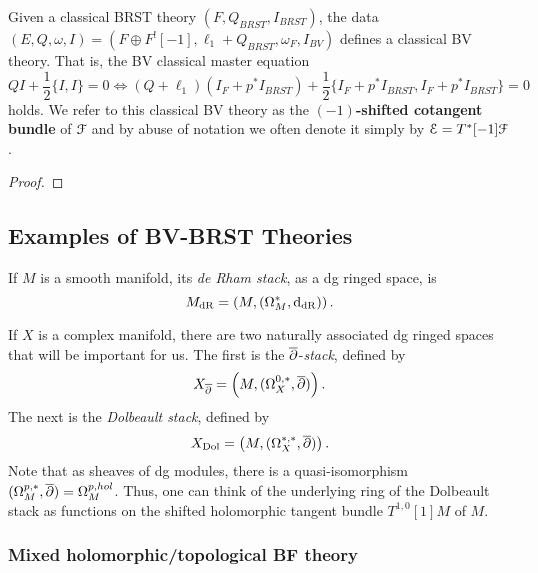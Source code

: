 \documentclass[10pt, oneside]{article}
\begin{document}
\begin{lemma}
Given a classical BRST theory $(F, Q_{BRST}, I_{BRST})$, the data $(E, Q, \omega, I) = (F \oplus F^![-1] , \ell_1 + Q_{BRST} , \omega_F, I_{BV})$ defines a classical BV theory.
That is, the BV classical master equation
\[
Q I + \frac{1}{2} \{I, I\} = 0 \iff (Q + \ell_1) (I_F + p^*I_{BRST}) + \frac{1}{2} \{I_F + p^*I_{BRST}, I_F + p^*I_{BRST}\} = 0
\]
holds.
We refer to this classical BV theory as the {\bf $(-1)$-shifted cotangent bundle} of $\mathcal F$ and by abuse of notation we often denote it simply by $\mathcal E = T^*[-1] \mathcal F$.
\end{lemma}

\begin{proof}
\end{proof}


\subsection{Examples of BV-BRST Theories}


If $M$ is a smooth manifold, its {\em de Rham stack}, as a dg ringed space, is 
\[
M_{\rm dR} = \left(M , (\Omega^*_M, {\rm d}_{\rm dR})\right) .
\] 

If $X$ is a complex manifold, there are two naturally associated dg ringed spaces that will be important for us. 
The first is the $\overline{\partial}$-{\em stack}, defined by
\[
X_{\overline{\partial}} = \left(M , (\Omega^{0,*}_X, \overline{\partial}) \right) .
\]
The next is the {\em Dolbeault stack}, defined by
\[
X_{\rm Dol} = \left(M, (\Omega^{*,*}_X, \overline{\partial})\right) .
\] 
Note that as sheaves of dg modules, there is a quasi-isomorphism $(\Omega^{p,*}_M, \overline{\partial}) = \Omega^{p, hol}_M$.
Thus, one can think of the underlying ring of the Dolbeault stack as functions on the shifted holomorphic tangent bundle $T^{1,0} [1] M$ of $M$. 

\subsubsection{Mixed holomorphic/topological BF theory}
\end{document}
